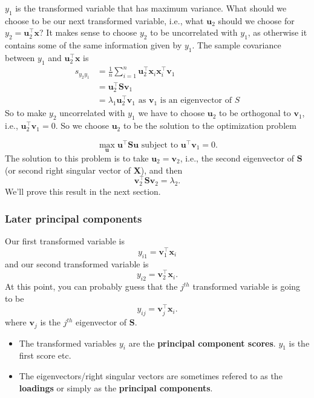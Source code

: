 \documentclass[
]{book}
\providecommand{\tightlist}{%
  \setlength{\itemsep}{0pt}\setlength{\parskip}{0pt}}
\theoremstyle{definition}
\theoremstyle{definition}
\theoremstyle{definition}
\theoremstyle{definition}
\theoremstyle{remark}
\begin{document}
\(y_1\) is the transformed variable that has maximum variance. What should we choose to be our next transformed variable, i.e., what \(\mathbf u_2\) should we choose for \(y_2 = \mathbf u_2^\top \mathbf x\)? It makes sense to choose \(y_2\) to be uncorrelated with \(y_1\), as otherwise it contains some of the same information given by \(y_1\). The sample covariance between \(y_1\) and \(\mathbf u_2^\top \mathbf x\) is
\begin{align*}
s_{y_2y_1} &=\frac{1}{n}\sum_{i=1}^n \mathbf u_2^\top \mathbf x_i \mathbf x_i^\top \mathbf v_1\\ 
&= \mathbf u_2^\top \mathbf S\mathbf v_1\\
& = \lambda_1 \mathbf u_2^\top \mathbf v_1 \mbox{ as } \mathbf v_1 \mbox{ is an eigenvector of } S
\end{align*}
So to make \(y_2\) uncorrelated with \(y_1\) we have to choose \(\mathbf u_2\) to be orthogonal to \(\mathbf v_1\), i.e., \(\mathbf u_2^\top \mathbf v_1=0\). So we choose \(\mathbf u_2\) to be the solution to the optimization problem

\[\max_{\mathbf u} \mathbf u^\top \mathbf S\mathbf u\mbox{ subject to } \mathbf u^\top \mathbf v_1=0.\]
The solution to this problem is to take \(\mathbf u_2 = \mathbf v_2\), i.e., the second eigenvector of \(\mathbf S\) (or second right singular vector of \(\mathbf X\)), and then \[\mathbf v_2^\top \mathbf S\mathbf v_2=\lambda_2.\]
We'll prove this result in the next section.

\subsubsection*{Later principal components}\label{later-principal-components}

Our first transformed variable is
\[y_{i1}= \mathbf v_1^\top \mathbf x_i\]
and our second transformed variable is
\[y_{i2}= \mathbf v_2^\top \mathbf x_i.\]
At this point, you can probably guess that the \(j^{th}\) transformed variable is going to be
\[y_{ij}= \mathbf v_j^\top \mathbf x_i.\]
where \(\mathbf v_j\) is the \(j^{th}\) eigenvector of \(\mathbf S\).

\begin{itemize}
\tightlist
\item
  The transformed variables \(y_{i}\) are the \textbf{principal component scores}. \(y_1\) is the first score etc.
\item
  The eigenvectors/right singular vectors are sometimes refered to as the \textbf{loadings} or simply as the \textbf{principal components}.
\end{itemize}
\end{document}
